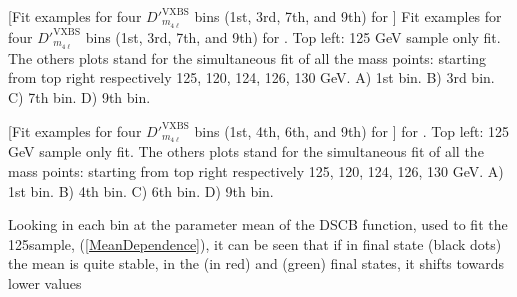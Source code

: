 \begin{multiFigure}
    \centering
        [Fit examples for four $D'^{\text{VXBS}}_{m_{4\ell}}$ bins (1st, 3rd, 7th, and 9th) for ]
        {Fit examples for four $D'^{\text{VXBS}}_{m_{4\ell}}$ bins (1st, 3rd, 7th, and 9th) 
        for . Top left: 125 GeV sample only fit. The others plots stand for the simultaneous 
        fit of all the mass points: starting from top right respectively 125, 120, 124, 126, 130 GeV.
        \;A) 1st bin.
        \;B) 3rd bin.
        \;C) 7th bin.
        \;D) 9th bin.}
        \label{signal_lineshape_2018_2e2mu}
\end{multiFigure}
\begin{multiFigure}
    \centering
        [Fit examples for four $D'^{\text{VXBS}}_{m_{4\ell}}$ bins (1st, 4th, 6th, and 9th) 
        for ]
        {
        for . Top left: 125 GeV sample only fit. The others plots stand for the simultaneous 
        fit of all the mass points: starting from top right respectively 125, 120, 124, 126, 130 GeV.
        \;A) 1st bin.
        \;B) 4th bin.
        \;C) 6th bin.
        \;D) 9th bin.} %
    \label{signal_lineshape_2018_2mu2e}
\end{multiFigure}
Looking in each bin at the parameter mean of the DSCB function, used to fit the 125\GeV sample, 
(\cref{MeanDependence}), it can be seen that if in \fourmu final state (black dots) the mean
is quite stable, in the \foure (in red) and \twoetwomu (green) final states, it shifts towards lower values
